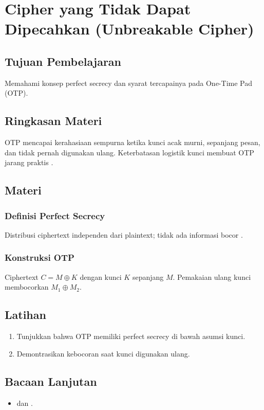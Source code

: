 \documentclass[../main.tex]{subfiles}
\begin{document}
\chapter{Cipher yang Tidak Dapat Dipecahkan (Unbreakable Cipher)}
\section{Tujuan Pembelajaran}
Memahami konsep perfect secrecy dan syarat tercapainya pada One-Time Pad (OTP).

\section{Ringkasan Materi}
OTP mencapai kerahasiaan sempurna ketika kunci acak murni, sepanjang pesan, dan tidak pernah digunakan ulang. Keterbatasan logistik kunci membuat OTP jarang praktis \citep{shannon1949,wikipedia_otp}.

\section{Materi}
\subsection{Definisi Perfect Secrecy}
Distribusi ciphertext independen dari plaintext; tidak ada informasi bocor \citep{shannon1949}.

\subsection{Konstruksi OTP}
Ciphertext \(C = M \oplus K\) dengan kunci \(K\) sepanjang \(M\). Pemakaian ulang kunci membocorkan \(M_1\oplus M_2\).

\section{Latihan}
\begin{enumerate}
  \item Tunjukkan bahwa OTP memiliki perfect secrecy di bawah asumsi kunci.
  \item Demontrasikan kebocoran saat kunci digunakan ulang.
\end{enumerate}

\section{Bacaan Lanjutan}
\begin{itemize}
  \item \citep{shannon1949} dan \citep{wikipedia_otp}.
\end{itemize}
\end{document}
